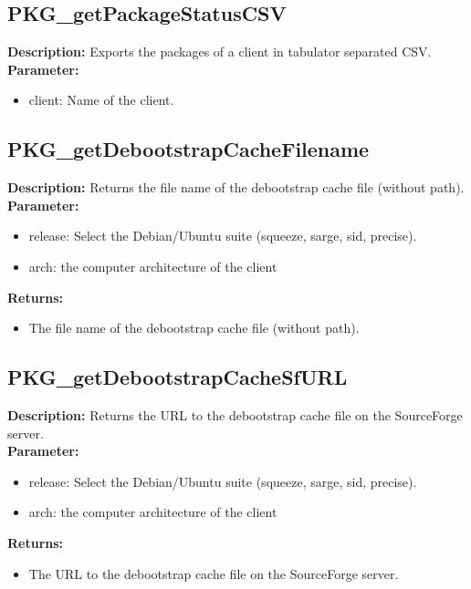 \subsection{PKG\_getPackageStatusCSV}
\textbf{Description:} Exports the packages of a client in tabulator separated CSV.\\
\textbf{Parameter:}
\begin{itemize}
\item client: Name of the client.
\end{itemize}

\subsection{PKG\_getDebootstrapCacheFilename}
\textbf{Description:} Returns the file name of the debootstrap cache file (without path).\\
\textbf{Parameter:}
\begin{itemize}
\item release: Select the Debian/Ubuntu suite (squeeze, sarge, sid, precise).
\item arch: the computer architecture of the client
\end{itemize}
\textbf{Returns:}
\begin{itemize}
\item The file name of the debootstrap cache file (without path).
\end{itemize}

\subsection{PKG\_getDebootstrapCacheSfURL}
\textbf{Description:} Returns the URL to the debootstrap cache file on the SourceForge server.\\
\textbf{Parameter:}
\begin{itemize}
\item release: Select the Debian/Ubuntu suite (squeeze, sarge, sid, precise).
\item arch: the computer architecture of the client
\end{itemize}
\textbf{Returns:}
\begin{itemize}
\item The URL to the debootstrap cache file on the SourceForge server.
\end{itemize}


